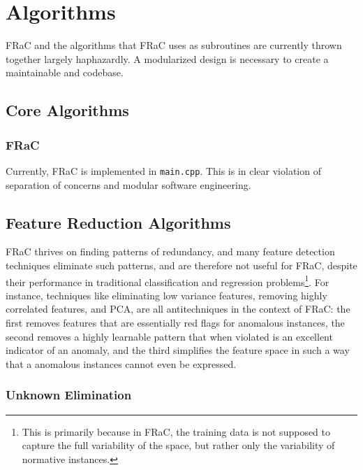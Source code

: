 \documentclass{article}
\begin{document}
\pagebreak[2]

\section{Algorithms}
\label{sec:alg}

\begin{multicols}{2}

FRaC and the algorithms that FRaC uses as subroutines are currently thrown together largely haphazardly.  A modularized design is necessary to create a maintainable and codebase.
 
\subsection{Core Algorithms}
\subsubsection{FRaC}

Currently, FRaC is implemented in \texttt{main.cpp}.  This is in clear violation of separation of concerns and modular software engineering.

\subsection{Feature Reduction Algorithms}

\color{reach}

FRaC thrives on finding patterns of redundancy, and many feature detection techniques eliminate such patterns, and are therefore not useful for FRaC, despite their performance in traditional classification and regression problems\footnote{This is primarily because in FRaC, the training data is not supposed to capture the full variability of the space, but rather only the variability of normative instances.}.  For instance, techniques like eliminating low variance features, removing highly correlated features, and PCA, are all antitechniques in the context of FRaC: the first removes features that are essentially red flags for anomalous instances, the second removes a highly learnable pattern that when violated is an excellent indicator of an anomaly, and the third simplifies the feature space in such a way that a anomalous instances cannot even be expressed.

\subsubsection{Unknown Elimination}


\end{multicols}
\end{document}
